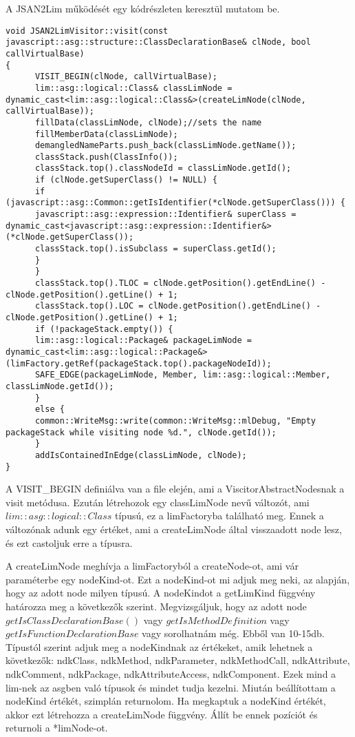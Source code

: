 A JSAN2Lim működését egy kódrészleten keresztül mutatom be.
\begin{lstlisting}[caption={ClassDeclaration Visitor}, label={lst:classdeclaration_visitor}, language={CStyle}]
void JSAN2LimVisitor::visit(const javascript::asg::structure::ClassDeclarationBase& clNode, bool callVirtualBase)
{
      VISIT_BEGIN(clNode, callVirtualBase);
      lim::asg::logical::Class& classLimNode = dynamic_cast<lim::asg::logical::Class&>(createLimNode(clNode, callVirtualBase));
      fillData(classLimNode, clNode);//sets the name
      fillMemberData(classLimNode);
      demangledNameParts.push_back(classLimNode.getName());
      classStack.push(ClassInfo());
      classStack.top().classNodeId = classLimNode.getId();
      if (clNode.getSuperClass() != NULL) {
      if (javascript::asg::Common::getIsIdentifier(*clNode.getSuperClass())) {
      javascript::asg::expression::Identifier& superClass = dynamic_cast<javascript::asg::expression::Identifier&>(*clNode.getSuperClass());
      classStack.top().isSubclass = superClass.getId();
      }
      }
      classStack.top().TLOC = clNode.getPosition().getEndLine() - clNode.getPosition().getLine() + 1;
      classStack.top().LOC = clNode.getPosition().getEndLine() - clNode.getPosition().getLine() + 1;
      if (!packageStack.empty()) {
      lim::asg::logical::Package& packageLimNode = dynamic_cast<lim::asg::logical::Package&>(limFactory.getRef(packageStack.top().packageNodeId));
      SAFE_EDGE(packageLimNode, Member, lim::asg::logical::Member, classLimNode.getId());
      }
      else {
      common::WriteMsg::write(common::WriteMsg::mlDebug, "Empty packageStack while visiting node %d.", clNode.getId());
      }
      addIsContainedInEdge(classLimNode, clNode);
}
\end{lstlisting}

A VISIT\_BEGIN definiálva van a file elején, ami a ViscitorAbstractNodesnak a visit metódusa.
Ezután létrehozok egy classLimNode nevű változót, ami ${lim::asg::logical::Class}$ típusú, ez a limFactoryba található meg.
Ennek a változónak adunk egy értéket, ami a createLimNode által visszaadott node lesz, és ezt castoljuk erre a típusra.

\noindent

A createLimNode meghívja a limFactoryból a createNode-ot, ami vár paraméterbe egy nodeKind-ot. Ezt a nodeKind-ot mi adjuk meg neki, az alapján, hogy az adott node milyen típusú.
A nodeKindot a getLimKind függvény határozza meg a következők szerint.
Megvizsgáljuk, hogy az adott node $getIsClassDeclarationBase()$ vagy $getIsMethodDefinition$ vagy $getIsFunctionDeclarationBase$ vagy sorolhatnám még. Ebből van 10-15db.
Típustól szerint adjuk meg a nodeKindnak az értékeket, amik lehetnek a következők: ndkClass, ndkMethod, ndkParameter, ndkMethodCall, ndkAttribute, ndkComment, ndkPackage, ndkAttributeAccess, ndkComponent.
Ezek mind a lim-nek az asgben való típusok és mindet tudja kezelni. Miután beállítottam a nodeKind értékét, szimplán returnolom.
Ha megkaptuk a nodeKind értékét, akkor ezt létrehozza a createLimNode függvény. Állít be ennek pozíciót és returnoli a *limNode-ot.

